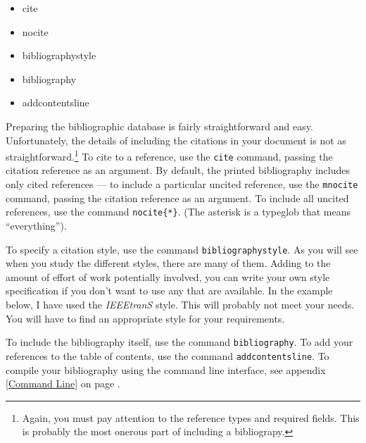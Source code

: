         \begin{framed}
            \begin{itemize}
                \item{cite}
                \item{nocite}
                \item{bibliographystyle}
                \item{bibliography}
                \item{addcontentsline}
            \end{itemize}
        \end{framed}

        Preparing the bibliographic database is fairly straightforward and easy. Unfortunately, the details of including the citations in your document is not as straightforward.\footnote{Again, you must pay attention to the reference types and required fields. This is probably the most onerous part of including a bibliograpy.} To cite to a reference, use the \texttt{cite} command, passing the citation reference as an argument. By default, the printed bibliography includes only cited references --- to include a particular uncited reference, use the \texttt{mnocite} command, passing the citation reference as an argument. To include all uncited references, use the command \texttt{nocite\{*\}}. (The asterisk is a typeglob that means ``everything'').

        To specify a citation style, use the command \texttt{bibliographystyle}. As you will see when you study the different styles, there are many of them. Adding to the amount of effort of work potentially involved, you can write your own style specification if you don't want to use any that are available. In the example below, I have used the \textit{IEEEtranS} style. This will probably not meet your needs. You will have to find an appropriate style for your requirements.

        To include the bibliography itself, use the command \texttt{bibliography}. To add your references to the table of contents, use the command \texttt{addcontentsline}. To compile your bibliography using the command line interface, see appendix \ref{Command Line} on page \pageref{Command Line}.
        
